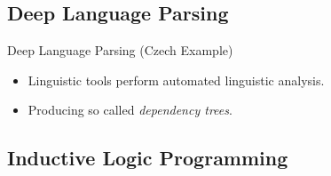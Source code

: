 \documentclass[xcolor=dvipsnames]{beamer}
\begin{document}
\subsection{Deep Language Parsing} 
\begin{frame}{Deep Language Parsing (Czech Example)}  
\begin{itemize}
	\item Linguistic tools perform automated linguistic analysis.
	\item Producing so called \emph{dependency trees}.
	\medskip
\end{itemize}
\end{frame}

\subsection{Inductive Logic Programming} 
\end{document}
